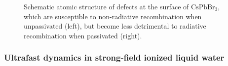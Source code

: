 \begin{figure}[h]
	\centering
	\caption{
		Schematic atomic structure of defects at the surface of \(\mathrm{CsPbBr_3}\), which are susceptible to non-radiative recombination when unpassivated (left), but become less detrimental to radiative recombination when passivated (right).
	}
	\label{fig:defect}
\end{figure}


\subsubsection{Ultrafast dynamics in strong-field ionized liquid water} 


